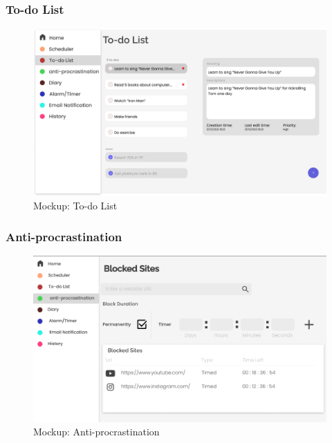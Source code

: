 \documentclass[a4paper]{article}
\begin{document}
\subsubsection{To-do List}

\begin{figure}[H] %
	\centering %
	\includegraphics[width=1\textwidth]{./images/Mockup_Todo_list.png} %
	\caption*{Mockup: To-do List} %
	\label{Fig.todolist} %
\end{figure}


\subsubsection{Anti-procrastination}

\begin{figure}[H] %
	\centering %
	\includegraphics[width=1\textwidth]{./images/Mockup_Anti-procrastination.png} %
	\caption*{Mockup: Anti-procrastination} %
	\label{Fig.Anti-procrastination} %
\end{figure}
\end{document}
